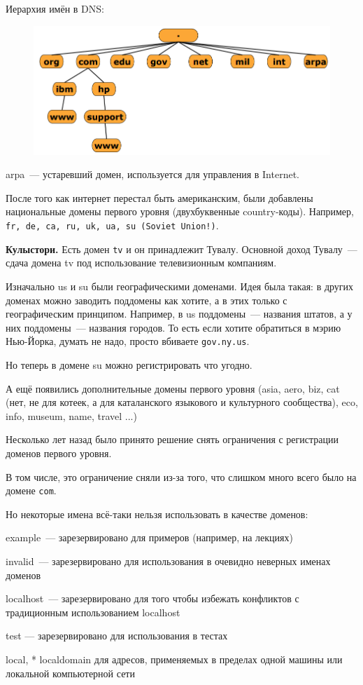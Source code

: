 Иерархия имён в DNS:

\begin{figure}[H]
  \centering
  \includegraphics[width=15cm]{images/05/01}
\end{figure}

arpa~--- устаревший домен, используется для управления в Internet.

После того как интернет перестал быть американским, были добавлены национальные домены первого уровня (двухбуквенные country-коды). Например, {\tt fr, de, ca, ru, uk, ua, su (Soviet Union!)}.

{\bf Кулыстори.} Есть домен {\tt tv} и он принадлежит Тувалу. Основной доход Тувалу~--- сдача домена tv под использование телевизионным компаниям.

Изначально us и su были географическими доменами. Идея была такая: в других доменах можно заводить поддомены как хотите, а в этих только с географическим принципом. Например, в us поддомены~--- названия штатов, а у них поддомены~--- названия городов. То есть если хотите обратиться в мэрию Нью-Йорка, думать не надо, просто вбиваете {\tt gov.ny.us}.

Но теперь в домене su можно регистрировать что угодно.

А ещё появились дополнительные домены первого уровня (asia, aero, biz, cat (нет, не для котеек, а для каталанского языкового и культурного сообщества), eco, info, museum, name, travel ...)

Несколько лет назад было принято решение снять ограничения с регистрации доменов первого уровня.

В том числе, это ограничение сняли из-за того, что слишком много всего было на домене {\tt com}.

Но некоторые имена всё-таки нельзя использовать в качестве доменов:
\begin{MyItemize}
    \item example~--- зарезервировано для примеров (например, на лекциях) 
    \item invalid~--- зарезервировано для использования в очевидно неверных именах доменов 
    \item localhost~--- зарезервировано для того чтобы избежать конфликтов с традиционным использованием localhost
    \item test — зарезервировано для использования в тестах
    \item * local, * localdomain для адресов, применяемых в пределах одной машины или локальной компьютерной сети
\end{MyItemize}

